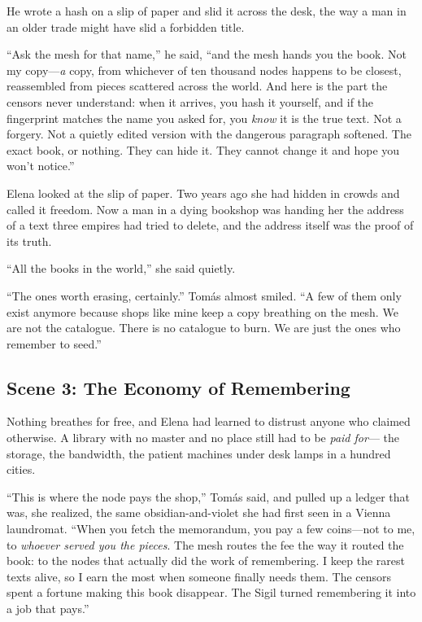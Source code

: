 \documentclass[12pt,letterpaper]{book}
\begin{document}
He wrote a hash on a slip of paper and slid it across the desk, the way a man in an
older trade might have slid a forbidden title.

``Ask the mesh for that name,'' he said, ``and the mesh hands you the book. Not my
copy---\emph{a} copy, from whichever of ten thousand nodes happens to be closest,
reassembled from pieces scattered across the world. And here is the part the censors
never understand: when it arrives, you hash it yourself, and if the fingerprint
matches the name you asked for, you \emph{know} it is the true text. Not a
forgery. Not a quietly edited version with the dangerous paragraph softened. The
exact book, or nothing. They can hide it. They cannot change it and hope you won't
notice.''

Elena looked at the slip of paper. Two years ago she had hidden in crowds and
called it freedom. Now a man in a dying bookshop was handing her the address of a
text three empires had tried to delete, and the address itself was the proof of its
truth.

``All the books in the world,'' she said quietly.

``The ones worth erasing, certainly.'' Tomás almost smiled. ``A few of them only
exist anymore because shops like mine keep a copy breathing on the mesh. We are not
the catalogue. There is no catalogue to burn. We are just the ones who remember to
seed.''

\hypertarget{scene-3-the-economy-of-remembering}{%
\subsection{Scene 3: The Economy of
Remembering}\label{scene-3-the-economy-of-remembering}}

Nothing breathes for free, and Elena had learned to distrust anyone who claimed
otherwise. A library with no master and no place still had to be \emph{paid for}---
the storage, the bandwidth, the patient machines under desk lamps in a hundred
cities.

``This is where the node pays the shop,'' Tomás said, and pulled up a ledger that
was, she realized, the same obsidian-and-violet she had first seen in a Vienna
laundromat. ``When you fetch the memorandum, you pay a few coins---not to me, to
\emph{whoever served you the pieces}. The mesh routes the fee the way it routed the
book: to the nodes that actually did the work of remembering. I keep the rarest
texts alive, so I earn the most when someone finally needs them. The censors
spent a fortune making this book disappear. The Sigil turned remembering it into a
job that pays.''
\end{document}
